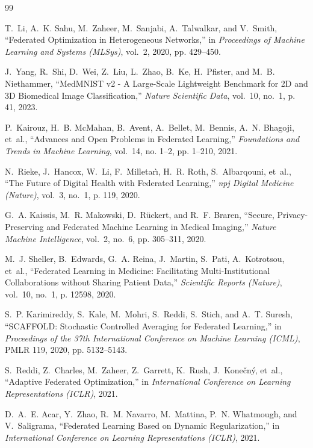 \documentclass[12pt,a4paper]{report}
\begin{document}
\begin{thebibliography}{99}

T.~Li, A.~K. Sahu, M.~Zaheer, M.~Sanjabi, A.~Talwalkar, and V.~Smith,
``Federated Optimization in Heterogeneous Networks,''
in \emph{Proceedings of Machine Learning and Systems (MLSys)}, vol.~2, 2020, pp. 429--450.

J.~Yang, R.~Shi, D.~Wei, Z.~Liu, L.~Zhao, B.~Ke, H.~Pfister, and M.~B. Niethammer,
``MedMNIST v2 - A Large-Scale Lightweight Benchmark for 2D and 3D Biomedical Image Classification,''
\emph{Nature Scientific Data}, vol.~10, no.~1, p. 41, 2023.

P.~Kairouz, H.~B. McMahan, B.~Avent, A.~Bellet, M.~Bennis, A.~N. Bhagoji, et~al.,
``Advances and Open Problems in Federated Learning,''
\emph{Foundations and Trends in Machine Learning}, vol.~14, no. 1--2, pp. 1--210, 2021.

N.~Rieke, J.~Hancox, W.~Li, F.~Milletar{\`\i}, H.~R. Roth, S.~Albarqouni, et~al.,
``The Future of Digital Health with Federated Learning,''
\emph{npj Digital Medicine (Nature)}, vol.~3, no.~1, p. 119, 2020.

G.~A. Kaissis, M.~R. Makowski, D.~R{\"u}ckert, and R.~F. Braren,
``Secure, Privacy-Preserving and Federated Machine Learning in Medical Imaging,''
\emph{Nature Machine Intelligence}, vol.~2, no.~6, pp. 305--311, 2020.

M.~J. Sheller, B.~Edwards, G.~A. Reina, J.~Martin, S.~Pati, A.~Kotrotsou, et~al.,
``Federated Learning in Medicine: Facilitating Multi-Institutional Collaborations without Sharing Patient Data,''
\emph{Scientific Reports (Nature)}, vol.~10, no.~1, p. 12598, 2020.

S.~P. Karimireddy, S.~Kale, M.~Mohri, S.~Reddi, S.~Stich, and A.~T. Suresh,
``SCAFFOLD: Stochastic Controlled Averaging for Federated Learning,''
in \emph{Proceedings of the 37th International Conference on Machine Learning (ICML)}, PMLR 119, 2020, pp. 5132--5143.

S.~Reddi, Z.~Charles, M.~Zaheer, Z.~Garrett, K.~Rush, J.~Kone{\v{c}}n{\'y}, et~al.,
``Adaptive Federated Optimization,''
in \emph{International Conference on Learning Representations (ICLR)}, 2021.

D.~A.~E. Acar, Y.~Zhao, R.~M. Navarro, M.~Mattina, P.~N. Whatmough, and V.~Saligrama,
``Federated Learning Based on Dynamic Regularization,''
in \emph{International Conference on Learning Representations (ICLR)}, 2021.


\end{thebibliography}
\end{document}
